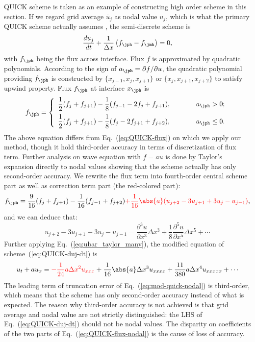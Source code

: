 \documentclass[]{article}
\begin{document}
QUICK scheme is taken as an example of constructing high order scheme in this
section.  
If we regard grid average $\bar u_j$ as nodal value $u_j$, which is what the primary QUICK
scheme actually assumes \cite{leonard1979stable}, the semi-discrete scheme is
\begin{equation}
    \frac{d u_j}{d t}+\frac{1}{\Delta x}\left(f_{\jph}-f_{\jmh}\right)=0,
    \label{eq:QUICK-duj-dt}
\end{equation}
with $f_\jph$ being the flux across interface. Flux $f$ is approximated by
quadratic polynomials. According to the sign of $a_\jph = \partial f/\partial
u$, the quadratic polynomial providing $f_\jph$ is constructed by $\{ x_{j-1}, x_j,
x_{j+1}
\}$ or $\{ x_j, x_{j+1}, x_{j+2} \}$ to satisfy upwind
property. Flux $f_\jph$ at interface $x_\jph$ is
\begin{equation*}
    f_{\jph}=\left\{\begin{array}{ll}
	\displaystyle
	\frac{1}{2}(f_j+f_{j+1})-\frac{1}{8}(f_{j-1}-2f_j+f_{j+1}),\hspace{1cm} & a_{\jph}>0;\\[3mm]
	\displaystyle
	\frac{1}{2}(f_j+f_{j+1})-\frac{1}{8}(f_j-2f_{j+1}+f_{j+2}),\hspace{1cm}
	& a_{\jph}\leq 0.\\
    \end{array}\right.
\end{equation*}
The above equation differs from Eq.~(\ref{eq:QUICK-flux}) on which we apply our
method, though it hold
third-order accuracy in terms of discretization of flux term. Further analysis on wave
equation with $f=au$ is done
by Taylor's expansion directly to nodal values showing that the scheme
actually has only second-order accuracy. We rewrite the flux term into
fourth-order central scheme part as well as correction term part (the red-colored part):
\begin{equation}
    f_{\jph}=\frac{9}{16}(f_j+f_{j+1})-\frac{1}{16}(f_{j-1}+f_{j+2}){\color{red}+\frac{1}{16}\abs{a}(u_{j+2}-3u_{j+1}+3u_{j}-u_{j-1})},
    \label{eq:QUICK-flux-nodal}
\end{equation}
and we can deduce that:
\[
    u_{j+2}-3u_{j+1}+3u_{j}-u_{j-1}=\frac{\partial^3 u}{\partial x^3}\Delta x^3+\frac{1}{8}\frac{\partial^5 u}{\partial x^5}\Delta x^5+\cdots
\]
Further applying Eq.~(\ref{eq:ubar_taylor_many}), the modified equation of
scheme~(\ref{eq:QUICK-duj-dt}) is 
\begin{equation}
    u_t+au_x={\color{red}-\frac{1}{24}a\Delta x^2 u_{xxx}}+\frac{1}{16}\abs{a}\Delta x^3 u_{xxxx}+\frac{11}{380}a\Delta x^4 u_{xxxxx} +\cdots
    \label{eq:mod-quick-nodal}
\end{equation}
The leading term of truncation error of Eq.~(\ref{eq:mod-quick-nodal}) is
third-order, which means that the scheme has only second-order accuracy instead
of what is expected. The reason why third-order accuracy is not achieved is that
grid average and nodal value are not strictly distinguished: the LHS of
Eq.~(\ref{eq:QUICK-duj-dt}) should not be nodal values. The disparity on
coefficients of the two parts of Eq.~(\ref{eq:QUICK-flux-nodal}) is the cause of loss of
accuracy.
\end{document}
